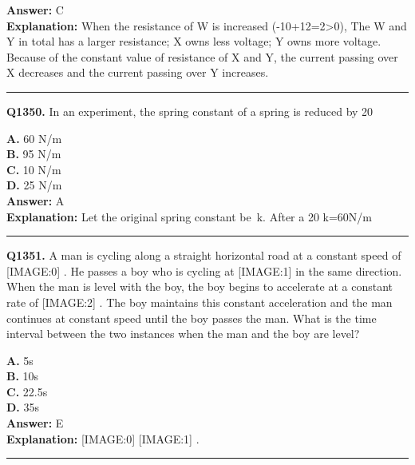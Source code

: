 \documentclass[12pt]{article}
\begin{document}
\textbf{Answer:} C \\
\textbf{Explanation:} When the resistance of W is increased (-10+12=2>0), The W and Y in total has a larger resistance; X owns less voltage; Y owns more voltage. Because of the constant value of resistance of X and Y, the current passing over X decreases and the current passing over Y increases.

\hrule
\vspace{1em}


\noindent
\textbf{Q1350.} In an experiment, the spring constant of a spring is reduced by 20%



\textbf{A.} 60 N/m \\
\textbf{B.} 95 N/m \\
\textbf{C.} 10 N/m \\
\textbf{D.} 25 N/m \\

\textbf{Answer:} A \\
\textbf{Explanation:} Let the original spring constant be k. After a 20%
k=60N/m

\hrule
\vspace{1em}


\noindent
\textbf{Q1351.} A man is cycling along a straight horizontal road at a constant speed of
[IMAGE:0]
. He passes a boy who is cycling at
[IMAGE:1]
in the same direction. When the man is level with the boy, the boy begins to accelerate at a constant rate of
[IMAGE:2]
. The boy maintains this constant acceleration and the man continues at constant speed until the boy passes the man. What is the time interval between the two instances when the man and the boy are level?



\textbf{A.} 5s \\
\textbf{B.} 10s \\
\textbf{C.} 22.5s \\
\textbf{D.} 35s \\

\textbf{Answer:} E \\
\textbf{Explanation:} [IMAGE:0]
[IMAGE:1]
.

\hrule
\vspace{1em}
\end{document}
